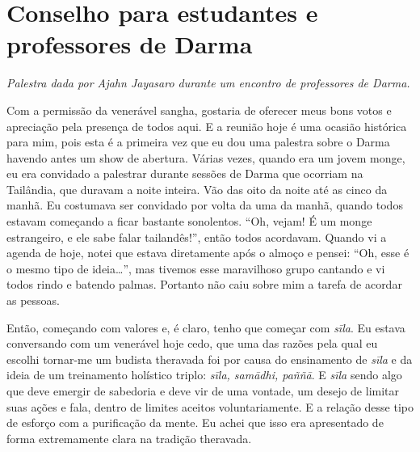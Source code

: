 
\chapter{Conselho para estudantes e professores de Darma}

{\itshape
Palestra dada por Ajahn Jayasaro durante um encontro de professores de
Darma.}

Com a permissão da venerável sangha, gostaria de oferecer meus bons
votos e apreciação pela presença de todos aqui. E a reunião hoje é uma
ocasião histórica para mim, pois esta é a primeira vez que eu dou uma
palestra sobre o Darma havendo antes um show de abertura. Várias vezes,
quando era um jovem monge, eu era convidado a palestrar durante sessões
de Darma que ocorriam na Tailândia, que duravam a noite inteira. Vão
das oito da noite até as cinco da manhã. Eu costumava ser convidado por
volta da uma da manhã, quando todos estavam começando a ficar bastante
sonolentos. “Oh, vejam! É um monge estrangeiro, e ele sabe falar
tailandês!”, então todos acordavam. Quando vi a agenda de hoje, notei
que estava diretamente após o almoço e pensei: “Oh, esse é o mesmo tipo
de ideia…”, mas tivemos esse maravilhoso grupo cantando e vi todos
rindo e batendo palmas. Portanto não caiu sobre mim a tarefa de acordar
as pessoas. 

Então, começando com valores e, é claro, tenho que começar com
\textit{sīla}. Eu estava conversando com um venerável hoje cedo, que
uma das razões pela qual eu escolhi tornar-me um budista theravada foi
por causa do ensinamento de \textit{sīla} e da ideia de um
treinamento holístico triplo: \textit{sīla, samādhi, paññā}. E
\textit{sīla} sendo algo que deve emergir de sabedoria e deve vir de
uma vontade, um desejo de limitar suas ações e fala, dentro de limites
aceitos voluntariamente. E a relação desse tipo de esforço com a
purificação da mente. Eu achei que isso era apresentado de forma
extremamente clara na tradição theravada. 

